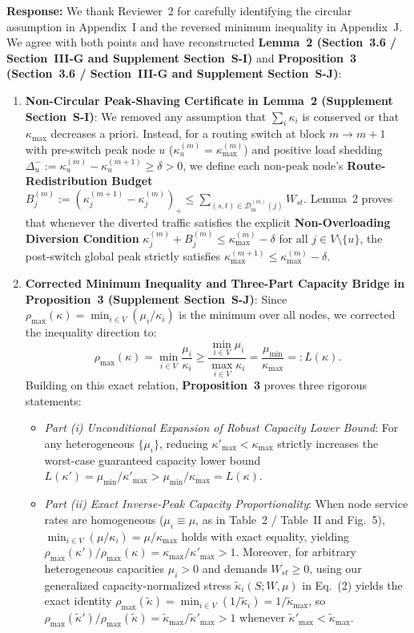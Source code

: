 \documentclass[11pt,a4paper]{article}
\begin{document}
\noindent\textbf{Response:} We thank Reviewer~2 for carefully identifying the circular assumption in Appendix~I and the reversed minimum inequality in Appendix~J. We agree with both points and have reconstructed \textbf{Lemma~2 (Section~3.6 / Section~III-G and Supplement Section~S-I)} and \textbf{Proposition~3 (Section~3.6 / Section~III-G and Supplement Section~S-J)}:
\begin{enumerate}[leftmargin=1.8em]
    \item \textbf{Non-Circular Peak-Shaving Certificate in Lemma~2 (Supplement Section~S-I)}: We removed any assumption that $\sum_i \kappa_i$ is conserved or that $\kappa_{\max}$ decreases a priori. Instead, for a routing switch at block $m \to m+1$ with pre-switch peak node $u$ ($\kappa_u^{(m)} = \kappa_{\max}^{(m)}$) and positive load shedding $\Delta_u^- := \kappa_u^{(m)} - \kappa_u^{(m+1)} \ge \delta > 0$, we define each non-peak node's \textbf{Route-Redistribution Budget} $B_j^{(m)} := (\kappa_j^{(m+1)} - \kappa_j^{(m)})_+ \le \sum_{(s,t)\in\mathcal{D}_{\text{in}}^{(m)}(j)} W_{st}$. Lemma~2 proves that whenever the diverted traffic satisfies the explicit \textbf{Non-Overloading Diversion Condition} $\kappa_j^{(m)} + B_j^{(m)} \le \kappa_{\max}^{(m)} - \delta$ for all $j \in V \setminus \{u\}$, the post-switch global peak strictly satisfies $\kappa_{\max}^{(m+1)} \le \kappa_{\max}^{(m)} - \delta$.
    \item \textbf{Corrected Minimum Inequality and Three-Part Capacity Bridge in Proposition~3 (Supplement Section~S-J)}: Since $\rho_{\max}(\kappa) = \min_{i\in V}(\mu_i/\kappa_i)$ is the minimum over all nodes, we corrected the inequality direction to:
    \[
        \rho_{\max}(\kappa) = \min_{i \in V}\frac{\mu_i}{\kappa_i} \ge \frac{\min_{i\in V}\mu_i}{\max_{i\in V}\kappa_i} = \frac{\mu_{\min}}{\kappa_{\max}} =: L(\kappa).
    \]
    Building on this exact relation, \textbf{Proposition~3} proves three rigorous statements:
    \begin{itemize}
        \item \textit{Part (i) Unconditional Expansion of Robust Capacity Lower Bound}: For any heterogeneous $\{\mu_i\}$, reducing $\kappa'_{\max} < \kappa_{\max}$ strictly increases the worst-case guaranteed capacity lower bound $L(\kappa') = \mu_{\min}/\kappa'_{\max} > \mu_{\min}/\kappa_{\max} = L(\kappa)$.
        \item \textit{Part (ii) Exact Inverse-Peak Capacity Proportionality}: When node service rates are homogeneous ($\mu_i \equiv \mu$, as in Table~2 / Table~II and Fig.~5), $\min_{i\in V}(\mu/\kappa_i) = \mu/\kappa_{\max}$ holds with exact equality, yielding $\rho_{\max}(\kappa')/\rho_{\max}(\kappa) = \kappa_{\max}/\kappa'_{\max} > 1$. Moreover, for arbitrary heterogeneous capacities $\mu_i > 0$ and demands $W_{st} \ge 0$, using our generalized capacity-normalized stress $\widetilde{\kappa}_i(S;W,\mu)$ in Eq.~(2) yields the exact identity $\rho_{\max}(\widetilde{\kappa}) = \min_{i\in V}(1/\widetilde{\kappa}_i) = 1/\widetilde{\kappa}_{\max}$, so $\rho_{\max}(\widetilde{\kappa}')/\rho_{\max}(\widetilde{\kappa}) = \widetilde{\kappa}_{\max}/\widetilde{\kappa}'_{\max} > 1$ whenever $\widetilde{\kappa}'_{\max} < \widetilde{\kappa}_{\max}$.

\end{itemize}
\end{enumerate}
\end{document}
